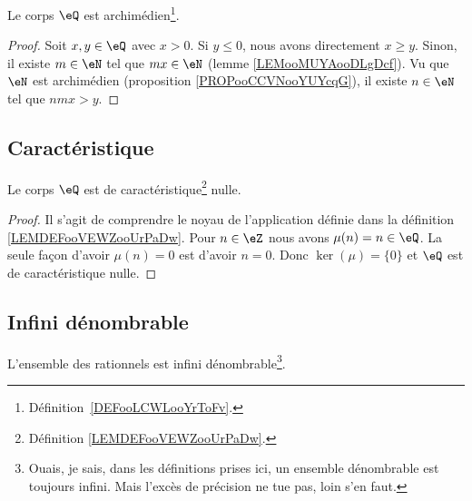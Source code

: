 \begin{proposition}     \label{PROPooMXGPooDUkOuv}
	Le corps \( \eQ\) est archimédien\footnote{Définition~\ref{DEFooLCWLooYrToFv}.}.
\end{proposition}

\begin{proof}
	Soit \( x,y\in\eQ\) avec \( x>0\). Si \( y\leq 0\), nous avons directement \( x\geq y\). Sinon, il existe \( m\in \eN\) tel que \( mx\in \eN\) (lemme \ref{LEMooMUYAooDLgDcf}). Vu que \( \eN\) est archimédien (proposition \ref{PROPooCCVNooYUYcqG}), il existe \( n\in \eN\) tel que \( nmx>y\).
\end{proof}


\subsection{Caractéristique}

\begin{lemma}       \label{LEMooYCPUooNxEPhB}
	Le corps \( \eQ\) est de caractéristique\footnote{Définition \ref{LEMDEFooVEWZooUrPaDw}.} nulle.
\end{lemma}

\begin{proof}
	Il s'agit de comprendre le noyau de l'application définie dans la définition \ref{LEMDEFooVEWZooUrPaDw}. Pour \( n\in \eZ\) nous avons \( \mu(n)=n\in \eQ\). La seule façon d'avoir \( \mu(n)=0\) est d'avoir \( n=0\). Donc \( \ker(\mu)=\{ 0 \}\) et \( \eQ\) est de caractéristique nulle.
\end{proof}


\subsection{Infini dénombrable}


\begin{proposition}     \label{PROPooDHIAooZysvNs}
	L'ensemble des rationnels est infini dénombrable\footnote{Ouais, je sais, dans les définitions prises ici, un ensemble dénombrable est toujours infini. Mais l'excès de précision ne tue pas, loin s'en faut.}.
\end{proposition}

